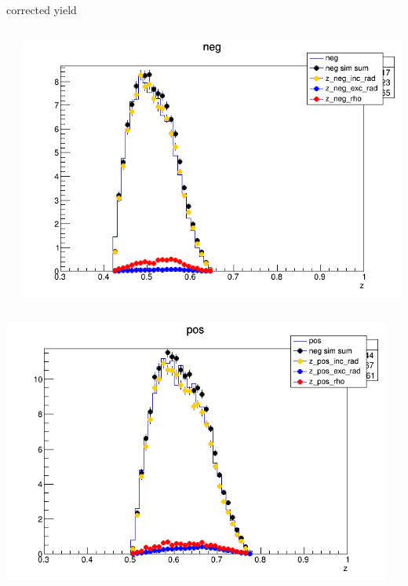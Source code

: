 \begin{frame}{corrected yield}
\begin{columns}
\begin{column}[T]{0.25\textwidth}
\end{column}
\begin{column}[T]{0.25\textwidth}
\includegraphics[width = \textwidth]{results/yield/statistics_corr/yield_x_Q2_z_0.45_4.750_0.50_neg.png}
\end{column}
\end{columns}
\begin{columns}
\begin{column}[T]{0.25\textwidth}
\includegraphics[width = \textwidth]{results/yield/statistics_corr/yield_x_Q2_z_0.45_4.750_0.60_pos.png}
\end{column}
\begin{column}[T]{0.25\textwidth}

\end{column}
\end{columns}
\end{frame}
